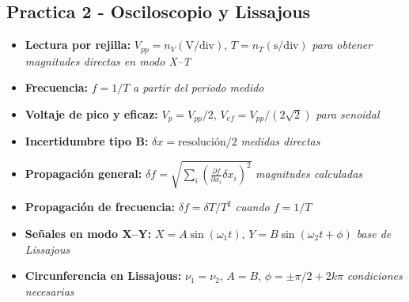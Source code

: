 \subsection*{Practica 2 - Osciloscopio y Lissajous}
\begin{itemize}
  \item \textbf{Lectura por rejilla:} $V_{pp}=n_V(\mathrm{V/div})$, $T=n_T(\mathrm{s/div})$ \hfill \textit{para obtener magnitudes directas en modo X--T}
  \item \textbf{Frecuencia:} $f=1/T$ \hfill \textit{a partir del periodo medido}
  \item \textbf{Voltaje de pico y eficaz:} $V_p=V_{pp}/2$, $V_{ef}=V_{pp}/(2\sqrt{2})$ \hfill \textit{para senoidal}
  \item \textbf{Incertidumbre tipo B:} $\delta x=\text{resolución}/2$ \hfill \textit{medidas directas}
  \item \textbf{Propagación general:} $\delta f=\sqrt{\sum_i\left(\frac{\partial f}{\partial x_i}\delta x_i\right)^2}$ \hfill \textit{magnitudes calculadas}
  \item \textbf{Propagación de frecuencia:} $\delta f=\delta T/T^2$ \hfill \textit{cuando $f=1/T$}
  \item \textbf{Señales en modo X--Y:} $X=A\sin(\omega_1 t)$, $Y=B\sin(\omega_2 t+\phi)$ \hfill \textit{base de Lissajous}
  \item \textbf{Circunferencia en Lissajous:} $\nu_1=\nu_2$, $A=B$, $\phi=\pm\pi/2+2k\pi$ \hfill \textit{condiciones necesarias}
\end{itemize}
